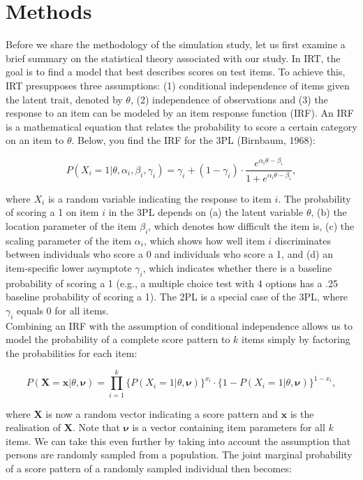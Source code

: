 \documentclass[Royal,sageapa,times,doublespace]{Manuscript-Files/sagej}
\begin{document}
\section{Methods}
Before we share the methodology of the simulation study, let us first examine a brief summary on the statistical theory associated with our study. In IRT, the goal is to find a model that best describes scores on test items. To achieve this, IRT presupposes three assumptions: (1) conditional independence of items given the latent trait, denoted by $\theta$, (2) independence of observations and (3) the response to an item can be modeled by an item response function (IRF). An IRF is a mathematical equation that relates the probability to score a certain category on an item to $\theta$. Below, you find the IRF for the 3PL (Birnbaum, 1968):

\begin{equation}
P(X_i = 1 | \theta, \alpha_{i}, \beta_{i}, \gamma_{i}) = \gamma_{i} + (1 - \gamma_{i}) \cdot 
\frac{e^{\alpha_{i}\theta - \beta_{i}}}{1 + e^{\alpha_{i}\theta - \beta_{i}}},
\end{equation}

where $X_i$ is a random variable indicating the response to item $i$. The probability of scoring a 1 on item $i$ in the 3PL depends on (a) the latent variable $\theta$, (b) the location parameter of the item $\beta_{i}$, which denotes how difficult the item is, (c) the scaling parameter of the item $\alpha_{i}$, which shows how well item $i$ discriminates between individuals who score a 0 and individuals who score a 1, and (d) an item-specific lower asymptote $\gamma_{i}$, which indicates whether there is a baseline probability of scoring a 1 (e.g., a multiple choice test with 4 options has a .25 baseline probability of scoring a 1). The 2PL is a special case of the 3PL, where $\gamma_{i}$ equals 0 for all items. \\
\indent Combining an IRF with the assumption of conditional independence allows us to model the probability of a complete score pattern to $k$ items simply by factoring the probabilities for each item:

\begin{equation}
P(\boldsymbol{X} = \boldsymbol{x} | \theta, \boldsymbol{\nu}) = \prod_{i=1}^{k} \{P(X_i = 1 | \theta, \boldsymbol{\nu})\}^{x_i} \cdot  \{1 - P(X_i = 1 | \theta, \boldsymbol{\nu}) \}^{1 - x_i},
\end{equation}

where $\boldsymbol{X}$ is now a random vector indicating a score pattern and $\boldsymbol{x}$ is the realisation of $\boldsymbol{X}$. Note that $\boldsymbol{\nu}$ is a vector containing item parameters for all $k$ items. We can take this even further by taking into account the assumption that persons are randomly sampled from a population. The joint marginal probability of a score pattern of a randomly sampled individual then becomes:
\end{document}
